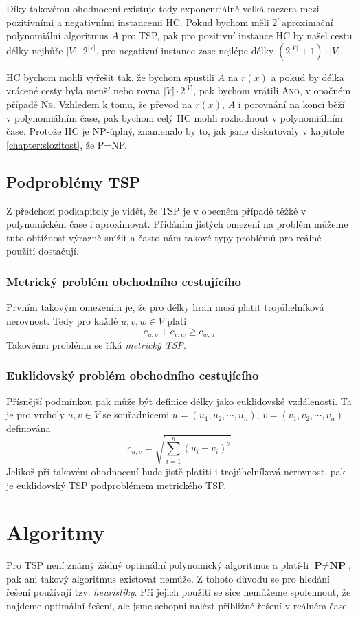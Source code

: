 \documentclass[
  printversion=false,
  joinlists=true,
  glossaries=true,
  figures=true,
  tables=true,
  sourcecodes=false,
  theorems=false,
  bibencoding=utf8,
  language=czech,
  encoding=utf8,
  program=infpvs,
  index=true,
  biblatex=true
]{kidiplom}
\begin{document}
Díky takovému ohodnocení existuje tedy exponenciálně velká mezera mezi pozitivními a negativními instancemi HC. Pokud bychom měli $2^n$\textendash aproximační polynomiální algoritmus $A$ pro TSP, pak pro pozitivní instance HC by našel cestu délky nejhůře $|V|\cdot2^{|V|}$, pro negativní instance zase nejlépe délky $(2^{|V|} + 1) \cdot |V|$.

HC bychom mohli vyřešit tak, že bychom spustili $A$ na $r(x)$ a pokud by délka vrácené cesty byla menší nebo rovna $|V|\cdot2^{|V|}$, pak bychom vrátili \textsc{Ano}, v opačném případě \textsc{Ne}. Vzhledem k tomu, že převod na $r(x)$, $A$ i porovnání na konci běží v polynomiálním čase, pak bychom celý HC mohli rozhodnout v polynomiálním čase. Protože HC je NP-úplný, znamenalo by to, jak jsme diskutovaly v kapitole \ref{chapter:slozitost}, že P=NP.

\subsection{Podproblémy TSP}
Z předchozí podkapitoly je vidět, že TSP je v obecném případě těžké v polynomickém čase i aproximovat. Přidáním jistých omezení na problém můžeme tuto obtížnost výrazně snížit a často nám takové typy problémů pro reálné použití dostačují.

\subsubsection{Metrický problém obchodního cestujícího}
Prvním takovým omezením je, že pro délky hran musí platit trojúhelníková nerovnost. Tedy pro každé $u, v, w \in V$ platí $$c_{u, v} + c_{v, w} \ge c_{w, u}$$
Takovému problému se říká \textit{metrický TSP}.

\subsubsection{Euklidovský problém obchodního cestujícího}
Přísnější podmínkou pak může být definice délky jako euklidovské vzdálenosti. Ta je pro vrcholy $u, v \in V$ se souřadnicemi $u = (u_1, u_2, \cdots, u_n)$, $v = (v_1, v_2, \cdots, v_n)$ definována
$$
c_{u, v} = \sqrt{\sum_{i=1}^{n} (u_i - v_i)^2}
$$
Jelikož při takovém ohodnocení bude jistě platiti i trojúhelníková nerovnost, pak je euklidovský TSP podproblémem metrického TSP.

\pagebreak
\section{Algoritmy}
Pro TSP není známý žádný optimální polynomický algoritmus a platí-li $\textbf{P} \ne \textbf{NP}$, pak ani takový algoritmus existovat nemůže. Z tohoto důvodu se pro hledání řešení používají tzv. \textit{heuristiky}. Při jejich použití se sice nemůžeme spolehnout, že najdeme optimální řešení, ale jsme schopni nalézt přibližné řešení v reálném čase.
\end{document}

